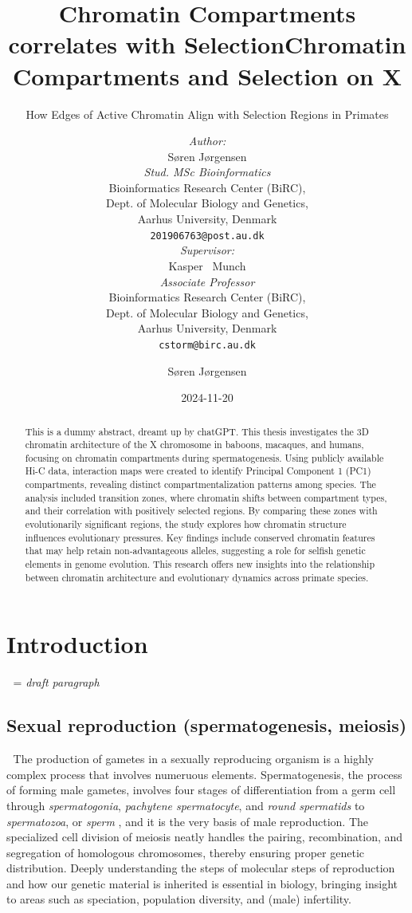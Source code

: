 \documentclass[
  a4paper,
  DIV=11,
  numbers=noendperiod]{scrartcl}
\title{Chromatin Compartments correlates with Selection}
\author{{\emph{Author:}\\
    Søren Jørgensen}	\\
    \emph{Stud. MSc Bioinformatics} \\
    Bioinformatics Research Center (BiRC),\\
    Dept. of Molecular Biology and Genetics,\\
	Aarhus University, Denmark \\
	\texttt{201906763@post.au.dk} \\
    \And
    {\emph{Supervisor:}\\
    Kasper ~Munch}	\\
    \emph{Associate Professor} \\
    Bioinformatics Research Center (BiRC),\\
    Dept. of Molecular Biology and Genetics,\\
	Aarhus University, Denmark \\
	\texttt{cstorm@birc.au.dk} \\
}
\title{Chromatin Compartments and Selection on X}
\subtitle{How Edges of Active Chromatin Align with Selection Regions in
Primates}
\author{Søren Jørgensen}
\date{2024-11-20}
\renewcommand*\contentsname{Table of contents}
\newcommand\contentsname{Table of contents}
\begin{document}
\maketitle
\begin{abstract}
This is a dummy abstract, dreamt up by chatGPT. This thesis investigates
the 3D chromatin architecture of the X chromosome in baboons, macaques,
and humans, focusing on chromatin compartments during spermatogenesis.
Using publicly available Hi-C data, interaction maps were created to
identify Principal Component 1 (PC1) compartments, revealing distinct
compartmentalization patterns among species. The analysis included
transition zones, where chromatin shifts between compartment types, and
their correlation with positively selected regions. By comparing these
zones with evolutionarily significant regions, the study explores how
chromatin structure influences evolutionary pressures. Key findings
include conserved chromatin features that may help retain
non-advantageous alleles, suggesting a role for selfish genetic elements
in genome evolution. This research offers new insights into the
relationship between chromatin architecture and evolutionary dynamics
across primate species.
\end{abstract}

\newpage
\tableofcontents
\newpage

\renewcommand*\contentsname{Table of contents}
{
\setcounter{tocdepth}{2}
\tableofcontents
}

\section{Introduction}\label{introduction}

{📝} = \emph{draft paragraph}

\subsection{Sexual reproduction (spermatogenesis,
meiosis)}\label{sexual-reproduction-spermatogenesis-meiosis}

{📝} The production of gametes in a sexually reproducing organism is a
highly complex process that involves numeruous elements.
Spermatogenesis, the process of forming male gametes, involves four
stages of differentiation from a germ cell through \emph{spermatogonia},
\emph{pachytene spermatocyte}, and \emph{round spermatids} to
\emph{spermatozoa}, or \emph{sperm} \citep{wang_reprogramming_2019}, and
it is the very basis of male reproduction. The specialized cell division
of meiosis neatly handles the pairing, recombination, and segregation of
homologous chromosomes, thereby ensuring proper genetic distribution.
Deeply understanding the steps of molecular steps of reproduction and
how our genetic material is inherited is essential in biology, bringing
insight to areas such as speciation, population diversity, and (male)
infertility.
\end{document}
